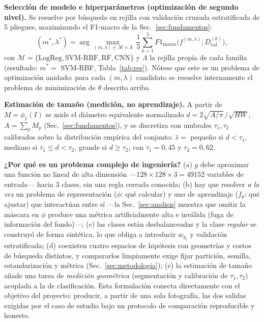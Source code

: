 \documentclass[conference]{IEEEtran}
\begin{document}
\textbf{Selección de modelo e hiperparámetros (optimización de segundo
nivel).} Se resuelve por búsqueda en rejilla con validación cruzada
estratificada de 5 pliegues, maximizando el F1-macro de la
Sec.~\ref{sec:fundamentos}:
\[
(m^\ast,\lambda^\ast)=\arg\max_{(m,\lambda)\in\mathcal{M}\times\Lambda}\
\frac{1}{5}\sum_{k=1}^{5} F1_{\text{macro}}\big(f^{(m,\lambda)};
D^{(k)}_{\text{val}}\big),
\]
con $\mathcal{M}=\{\text{LogReg},\text{SVM-RBF},\text{RF},\text{CNN}\}$ y
$\Lambda$ la rejilla propia de cada familia (resultado: $m^\ast=$ SVM-RBF,
Tabla~\ref{tab:res}). Nótese que este es un problema de optimización anidado:
para cada $(m,\lambda)$ candidato se resuelve internamente el problema de
minimización de $\theta$ descrito arriba.

\textbf{Estimación de tamaño (medición, no aprendizaje).} A partir de
$M=\phi_1(I)$ se mide el diámetro equivalente normalizado
$d=2\sqrt{A/\pi}\,/\sqrt{HW}$, $A=\sum_{p}M_p$ (Sec.~\ref{sec:fundamentos}), y
se discretiza con umbrales $\tau_1,\tau_2$ calibrados sobre la distribución
empírica del conjunto: $\hat s=$ pequeño si $d<\tau_1$, mediano si
$\tau_1\le d<\tau_2$, grande si $d\ge\tau_2$, con $\tau_1=0{,}45$ y
$\tau_2=0{,}62$.

\textbf{¿Por qué es un problema complejo de ingeniería?} (a) $g$ debe
aproximar una función no lineal de alta dimensión —$128\times128\times3=49152$
variables de entrada— hacia 3 clases, sin una regla cerrada conocida; (b) hay
que resolver \emph{a la vez} un problema de representación ($\phi$: qué
calcular) y uno de aprendizaje ($f_\theta$: qué ajustar) que interactúan entre
sí —la Sec.~\ref{sec:analisis} muestra que omitir la máscara en $\phi$ produce
una métrica artificialmente alta e inválida (fuga de información del fondo)—;
(c) las clases están desbalanceadas y la clase \emph{regular} se construyó de
forma sintética, lo que obliga a introducir $w_{y_i}$ y validación
estratificada; (d) coexisten cuatro espacios de hipótesis con geometrías y
costos de búsqueda distintos, y compararlos limpiamente exige fijar partición,
semilla, estandarización y métrica (Sec.~\ref{sec:metodologia}); (e) la
estimación de tamaño añade una tarea de \emph{medición geométrica}
(segmentación y calibración de $\tau_1,\tau_2$) acoplada a la de clasificación.
Esta formulación conecta directamente con el objetivo del proyecto: producir,
a partir de una sola fotografía, las dos salidas exigidas por el caso de
estudio bajo un protocolo de comparación reproducible y honesto.

\end{document}
